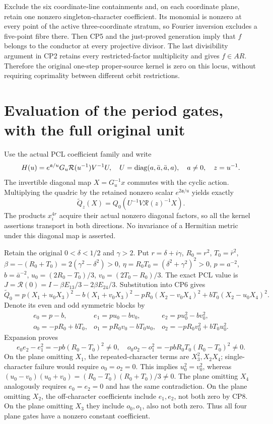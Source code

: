 \documentclass[11pt]{article}
\begin{document}
Exclude the six coordinate-line containments and, on each coordinate
plane, retain one nonzero singleton-character coefficient. Its monomial
is nonzero at every point of the active three-coordinate stratum, so
Fourier inversion excludes a five-point fibre there. Then CP5 and the just-proved
generation imply that $f$ belongs to the conductor at every
projective divisor. The last divisibility argument in CP2 retains
every restricted-factor multiplicity and gives $f\in AR$. Therefore
the original one-step proper-source kernel is zero on this locus,
without requiring coprimality between different orbit restrictions.

\section{Evaluation of the period gates, with the full original unit}
Use the actual PCL coefficient family \cite{pcofactor:PCL} and write
\[
 H(u)=e^{\mathfrak a/u}G_u\mathcal R(u^{-1})V^{-1}U,
 \quad U=\operatorname{diag}(a,\bar a,\bar a,a),\quad a\ne0,\quad z=u^{-1}.
\]
The invertible diagonal map $X=G_u^{-1}x$ commutes with the cyclic
action. Multiplying the quadric by the retained nonzero scalar
$e^{2\mathfrak a/u}$ yields exactly
\[
 \widetilde Q_z(X)=Q_0(U^{-1}V\mathcal R(z)^{-1}X).                 \tag{CP6}
\]
The products $x_i^{4r}$ acquire their actual nonzero diagonal
factors, so all the kernel assertions transport in both directions.
No invariance of a Hermitian metric under this diagonal map is asserted.

Retain the original $0<\delta<1/2$ and $\gamma>2$.
Put $r=\delta+i\gamma$, $R_0=r^2$, $T_0=\bar r^2$,
$\beta=-(R_0+T_0)=2(\gamma^2-\delta^2)>0$,
$\eta=R_0T_0=(\delta^2+\gamma^2)^2>0$, $p=a^{-2}$,
$b=\bar a^{-2}$, $u_0=(2R_0-T_0)/3$, $v_0=(2T_0-R_0)/3$.
The exact PCL value is $J=\mathcal R(0)=I-\beta E_{13}/3-2\beta E_{24}/3$.
Substitution into CP6 gives
\[
 \widetilde Q_0=p(X_1+u_0X_3)^2-b(X_1+v_0X_3)^2
       -pR_0(X_2-v_0X_4)^2+bT_0(X_2-u_0X_4)^2.                    \tag{CP7}
\]
Denote its even and odd symmetric blocks by
\[
 \begin{array}{lll}
 e_0=p-b,&e_1=pu_0-bv_0,&e_2=pu_0^2-bv_0^2,\\
 o_0=-pR_0+bT_0,&o_1=pR_0v_0-bT_0u_0,
     &o_2=-pR_0v_0^2+bT_0u_0^2.
 \end{array}
\]
Expansion proves
\[
 e_0e_2-e_1^2=-pb(R_0-T_0)^2\ne0,\quad
 o_0o_2-o_1^2=-pbR_0T_0(R_0-T_0)^2\ne0.                           \tag{CP8}
\]
On the plane omitting $X_1$, the repeated-character terms are
$X_3^2,X_2X_4$; single-character failure would require $o_0=o_2=0$.
This implies $u_0^2=v_0^2$, whereas
$(u_0-v_0)(u_0+v_0)=(R_0-T_0)(R_0+T_0)/3\ne0$.
The plane omitting $X_4$ analogously requires $e_0=e_2=0$ and
has the same contradiction. On the plane omitting $X_2$, the
off-character coefficients include $e_1,e_2$, not both zero by
CP8. On the plane omitting $X_3$ they include $o_0,o_1$, also
not both zero. Thus all four plane gates have a nonzero constant
coefficient.
\end{document}
